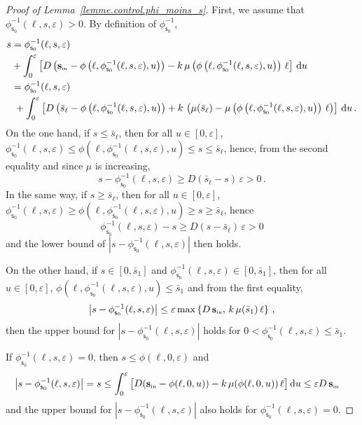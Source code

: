 \documentclass[AHL,Unicode,longabstracts,published]{cedram}
\newcommand{\Sin}{{\mathbf s}_{\textrm{\tiny\rm in}}}
\newcommand{\dif}{\mathrm{d}}
\newcommand{\barmu}{\mu(\bar s_1)}
\newcommand{\phis}{\phi_{\textsf{s}_0}^{-1}}
\newcommand{\1}{\mathbf{1}}
\begin{document}
\begin{proof}[Proof of Lemma~\ref{lemme.control.phi_moins_s}]
First, we assume that $\phis(\ell,s,\varepsilon)>0$. By definition of $\phis$,
\begin{align*}
s & = \phis(\ell,s,\varepsilon) \\
&+ \int_0^{\varepsilon}\left[D\left(\Sin-\phi\left(\ell,\phis(\ell,s,\varepsilon), u\right)\right)-k\,\mu\left(\phi\left(\ell,\phis(\ell,s,\varepsilon), u\right)\right)\,\ell\right]\,\dif u\\
& = \phis(\ell,s,\varepsilon)\\
&\; + \int_0^{\varepsilon}\left[D\left(\bar s_\ell-\phi\left(\ell,\phis(\ell,s,\varepsilon), u\right)\right)+k\,\left(\mu(\bar s_\ell)-\mu\left(\phi\left(\ell,\phis(\ell,s,\varepsilon), u\right)\right)\,\ell\right)\right]\,\dif u\,.
\end{align*}
On the one hand, if $s\leq \bar s_\ell$, then for all $u\in [0,\varepsilon]$, $\phis(\ell,s,\varepsilon)\leq \phi(\ell,\phis(\ell,s,\varepsilon), u) \leq s \leq \bar s_\ell$, hence, from the second equality and since $\mu$ is increasing,
\[
s-\phis(\ell,s,\varepsilon) \geq D(\bar s_\ell-s)\,\varepsilon>0\,.
\]
In the same way, if $s\geq \bar s_\ell$, then for all $u\in [0,\varepsilon]$, $\phis(\ell,s,\varepsilon)\geq \phi(\ell,\phis(\ell,s,\varepsilon), u) \geq s \geq \bar s_\ell$, hence
\[
\phis(\ell,s,\varepsilon) - s \geq D(s-\bar s_\ell)\,\varepsilon>0
\]
and the lower bound of $|s-\phis(\ell,s,\varepsilon)|$ then holds.

On the other hand, if $s \in [0,\bar s_1]$ and $\phis(\ell,s,\varepsilon) \in [0,\bar s_1]$, then for all $u\in[0,\varepsilon]$, $\phi(\ell,\phis(\ell,s,\varepsilon), u)\leq \bar s_1$ and from the first equality,
\[
\left|s-\phis(\ell,s,\varepsilon)\right| \leq \varepsilon \max\left\{D\,\Sin,\,k\,\barmu\,\ell\right\}\,,
\]
then the upper bound for $|s-\phis(\ell,s,\varepsilon)|$ holds for $0<\phis(\ell,s,\varepsilon)\leq \bar s_1$.

If $\phis(\ell,s,\varepsilon)=0$, then $s\leq \phi(\ell,0,\varepsilon)$ and
\begin{align*}
\left|s-\phis(\ell,s,\varepsilon)\right| =s & \leq \int_0^{\varepsilon}\big[D(\Sin-\phi(\ell,0,u))-k\,\mu(\phi(\ell,0,u))\,\ell\big]\,\dif u
\leq \varepsilon D\,\Sin
\end{align*}
and the upper bound for $|s-\phis(\ell,s,\varepsilon)| $ also holds for $\phis(\ell,s,\varepsilon)=0$.
\end{proof}
\end{document}
